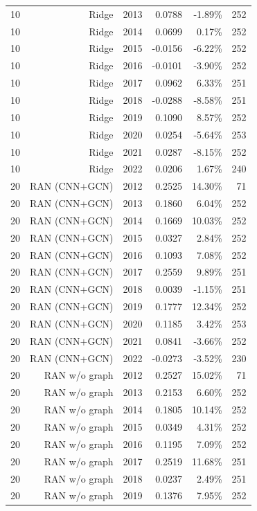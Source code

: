 \documentclass[10pt]{article}
\begin{document}
\begin{longtable}{lrrrrr}
10 & Ridge & 2013 & 0.0788 & -1.89\% & 252 \\
10 & Ridge & 2014 & 0.0699 & 0.17\% & 252 \\
10 & Ridge & 2015 & -0.0156 & -6.22\% & 252 \\
10 & Ridge & 2016 & -0.0101 & -3.90\% & 252 \\
10 & Ridge & 2017 & 0.0962 & 6.33\% & 251 \\
10 & Ridge & 2018 & -0.0288 & -8.58\% & 251 \\
10 & Ridge & 2019 & 0.1090 & 8.57\% & 252 \\
10 & Ridge & 2020 & 0.0254 & -5.64\% & 253 \\
10 & Ridge & 2021 & 0.0287 & -8.15\% & 252 \\
10 & Ridge & 2022 & 0.0206 & 1.67\% & 240 \\
20 & RAN (CNN+GCN) & 2012 & 0.2525 & 14.30\% & 71 \\
20 & RAN (CNN+GCN) & 2013 & 0.1860 & 6.04\% & 252 \\
20 & RAN (CNN+GCN) & 2014 & 0.1669 & 10.03\% & 252 \\
20 & RAN (CNN+GCN) & 2015 & 0.0327 & 2.84\% & 252 \\
20 & RAN (CNN+GCN) & 2016 & 0.1093 & 7.08\% & 252 \\
20 & RAN (CNN+GCN) & 2017 & 0.2559 & 9.89\% & 251 \\
20 & RAN (CNN+GCN) & 2018 & 0.0039 & -1.15\% & 251 \\
20 & RAN (CNN+GCN) & 2019 & 0.1777 & 12.34\% & 252 \\
20 & RAN (CNN+GCN) & 2020 & 0.1185 & 3.42\% & 253 \\
20 & RAN (CNN+GCN) & 2021 & 0.0841 & -3.66\% & 252 \\
20 & RAN (CNN+GCN) & 2022 & -0.0273 & -3.52\% & 230 \\
20 & RAN w/o graph & 2012 & 0.2527 & 15.02\% & 71 \\
20 & RAN w/o graph & 2013 & 0.2153 & 6.60\% & 252 \\
20 & RAN w/o graph & 2014 & 0.1805 & 10.14\% & 252 \\
20 & RAN w/o graph & 2015 & 0.0349 & 4.31\% & 252 \\
20 & RAN w/o graph & 2016 & 0.1195 & 7.09\% & 252 \\
20 & RAN w/o graph & 2017 & 0.2519 & 11.68\% & 251 \\
20 & RAN w/o graph & 2018 & 0.0237 & 2.49\% & 251 \\
20 & RAN w/o graph & 2019 & 0.1376 & 7.95\% & 252 \\

\end{longtable}
\end{document}
